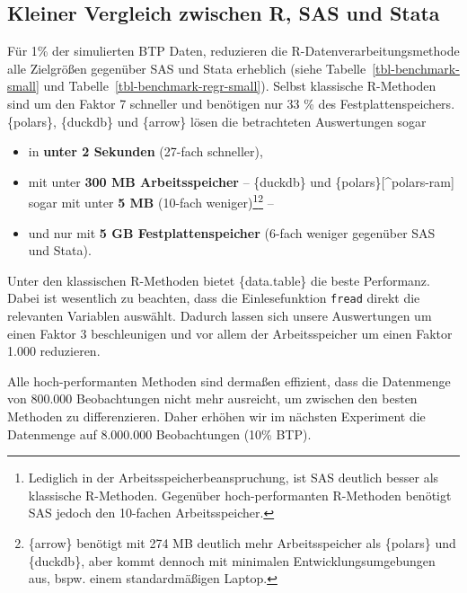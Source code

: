 \documentclass[
  german,
  10pt,
  twoside]{article}
\providecommand{\tightlist}{%
  \setlength{\itemsep}{0pt}\setlength{\parskip}{0pt}}
\let\oldref\ref
\renewcommand{\ref}[1]{\oldref{#1}\raisebox{-0.2ex}{\scriptsize\color{wistaBlue}\ding{247}}}
\begin{document}
\subsection{Kleiner Vergleich zwischen R, SAS und
Stata}\label{kleiner-vergleich-zwischen-r-sas-und-stata}

Für 1\% der simulierten BTP Daten, reduzieren die
R-Datenverarbeitungsmethode alle Zielgrößen gegenüber SAS und Stata
erheblich (siehe Tabelle~\ref{tbl-benchmark-small} und
Tabelle~\ref{tbl-benchmark-regr-small}). Selbst klassische R-Methoden
sind um den Faktor 7 schneller und benötigen nur 33 \% des
Festplattenspeichers. \{polars\}, \{duckdb\} und \{arrow\} lösen die
betrachteten Auswertungen sogar

\begin{itemize}
\tightlist
\item
  in \textbf{unter 2 Sekunden} (27-fach schneller),
\item
  mit unter \textbf{300 MB Arbeitsspeicher} -- \{duckdb\} und
  \{polars\}{[}\^{}polars-ram{]} sogar mit unter \textbf{5 MB} (10-fach
  weniger)\footnote{Lediglich in der Arbeitsspeicherbeanspruchung, ist
    SAS deutlich besser als klassische R-Methoden. Gegenüber
    hoch-performanten R-Methoden benötigt SAS jedoch den 10-fachen
    Arbeitsspeicher.}\footnote{\{arrow\} benötigt mit 274 MB deutlich
    mehr Arbeitsspeicher als \{polars\} und \{duckdb\}, aber kommt
    dennoch mit minimalen Entwicklungsumgebungen aus, bspw. einem
    standardmäßigen Laptop.} --
\item
  und nur mit \textbf{5 GB Festplattenspeicher} (6-fach weniger
  gegenüber SAS und Stata).
\end{itemize}

Unter den klassischen R-Methoden bietet \{data.table\} die beste
Performanz. Dabei ist wesentlich zu beachten, dass die Einlesefunktion
\texttt{fread} direkt die relevanten Variablen auswählt. Dadurch lassen
sich unsere Auswertungen um einen Faktor 3 beschleunigen und vor allem
der Arbeitsspeicher um einen Faktor 1.000 reduzieren.

Alle hoch-performanten Methoden sind dermaßen effizient, dass die
Datenmenge von 800.000 Beobachtungen nicht mehr ausreicht, um zwischen
den besten Methoden zu differenzieren. Daher erhöhen wir im nächsten
Experiment die Datenmenge auf 8.000.000 Beobachtungen (10\% BTP).
\end{document}
